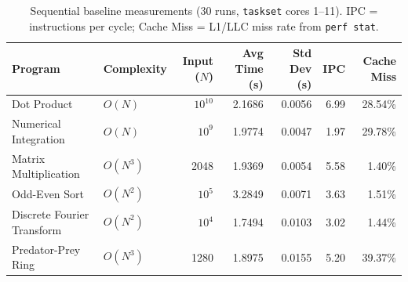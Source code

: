 
\begin{table}[htbp]
\centering
\caption{Sequential baseline measurements (30 runs, \texttt{taskset} cores 1--11).
  IPC = instructions per cycle; Cache Miss = L1/LLC miss rate from \texttt{perf stat}.}
\label{tab:baseline}
\begin{tabular}{llrrrrr}
\toprule
\textbf{Program} & \textbf{Complexity} & \textbf{Input ($N$)} & \textbf{Avg Time (s)} & \textbf{Std Dev (s)} & \textbf{IPC} & \textbf{Cache Miss} \\
\midrule
Dot Product & $O(N)$ & $10^{10}$ & 2.1686 & 0.0056 & 6.99 & 28.54\% \\
Numerical Integration & $O(N)$ & $10^9$ & 1.9774 & 0.0047 & 1.97 & 29.78\% \\
Matrix Multiplication & $O(N^3)$ & 2048 & 1.9369 & 0.0054 & 5.58 & 1.40\% \\
Odd-Even Sort & $O(N^2)$ & $10^5$ & 3.2849 & 0.0071 & 3.63 & 1.51\% \\
Discrete Fourier Transform & $O(N^2)$ & $10^4$ & 1.7494 & 0.0103 & 3.02 & 1.44\% \\
Predator-Prey Ring & $O(N^3)$ & 1280 & 1.8975 & 0.0155 & 5.20 & 39.37\% \\
\bottomrule
\end{tabular}
\end{table}

